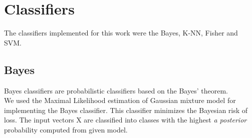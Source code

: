 \documentclass[english, a4paper, 12pt]{article}
\newcommand{\tab}{\hspace*{2em}}
\begin{document}
\pagebreak
\section{Classifiers}
\tab The classifiers implemented for this work were the Bayes, K-NN, Fisher and SVM.

\subsection{Bayes}
\tab Bayes classifiers are probabilistic classifiers based on the Bayes' theorem. \smallskip\\
\tab We used the Maximal Likelihood estimation of Gaussian mixture model for implementing the Bayes classifier. This classifier minimizes the Bayesian risk of loss. The input vectors X are classified into classes with the highest {\it a posterior} probability computed from given model.\smallskip\\
\end{document}
